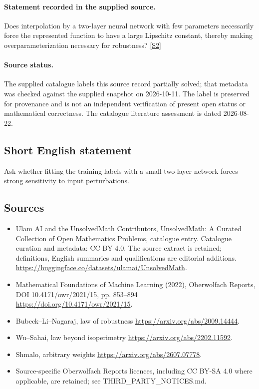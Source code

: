 \documentclass[11pt]{article}
\begin{document}
\paragraph{Statement recorded in the supplied source.}
Does interpolation by a two-layer neural network with few parameters necessarily force the represented function to have a large Lipschitz constant, thereby making overparameterization necessary for robustness? \href{https://doi.org/10.4171/owr/2021/15}{[S2]}
\paragraph{Source status.}
The supplied catalogue labels this source record partially solved; that metadata was checked against the supplied snapshot on 2026-10-11. The label is preserved for provenance and is not an independent verification of present open status or mathematical correctness. The catalogue literature assessment is dated 2026-08-22.
\subsection{Short English statement}
Ask whether fitting the training labels with a small two-layer network forces strong sensitivity to input perturbations.
\subsection{Sources}
\begin{itemize}
\item[S1] Ulam AI and the UnsolvedMath Contributors, UnsolvedMath: A Curated Collection of Open Mathematics Problems, catalogue entry. Catalogue curation and metadata: CC BY 4.0. The source extract is retained; definitions, English summaries and qualifications are editorial additions.
\url{https://huggingface.co/datasets/ulamai/UnsolvedMath}.
\item[S2] Mathematical Foundations of Machine Learning (2022), Oberwolfach Reports, DOI 10.4171/owr/2021/15, pp. 853--894
\url{https://doi.org/10.4171/owr/2021/15}.
\item[S3] Bubeck--Li--Nagaraj, law of robustness
\url{https://arxiv.org/abs/2009.14444}.
\item[S4] Wu--Sahai, law beyond isoperimetry
\url{https://arxiv.org/abs/2202.11592}.
\item[S5] Shmalo, arbitrary weights
\url{https://arxiv.org/abs/2607.07778}.
\item Source-specific Oberwolfach Reports licences, including CC BY-SA 4.0 where applicable, are retained; see THIRD\_PARTY\_NOTICES.md.
\end{itemize}
\end{document}
